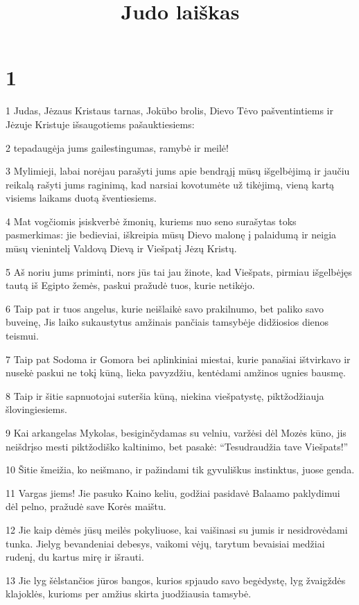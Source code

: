 

\title{Judo laiškas}

\chapter{1}


\par 1 Judas, Jėzaus Kristaus tarnas, Jokūbo brolis, Dievo Tėvo pašventintiems ir Jėzuje Kristuje išsaugotiems pašauktiesiems: 
\par 2 tepadaugėja jums gailestingumas, ramybė ir meilė! 
\par 3 Mylimieji, labai norėjau parašyti jums apie bendrąjį mūsų išgelbėjimą ir jaučiu reikalą rašyti jums raginimą, kad narsiai kovotumėte už tikėjimą, vieną kartą visiems laikams duotą šventiesiems. 
\par 4 Mat vogčiomis įsiskverbė žmonių, kuriems nuo seno surašytas toks pasmerkimas: jie bedieviai, iškreipia mūsų Dievo malonę į palaidumą ir neigia mūsų vienintelį Valdovą Dievą ir Viešpatį Jėzų Kristų. 
\par 5 Aš noriu jums priminti, nors jūs tai jau žinote, kad Viešpats, pirmiau išgelbėjęs tautą iš Egipto žemės, paskui pražudė tuos, kurie netikėjo. 
\par 6 Taip pat ir tuos angelus, kurie neišlaikė savo prakilnumo, bet paliko savo buveinę, Jis laiko sukaustytus amžinais pančiais tamsybėje didžiosios dienos teismui. 
\par 7 Taip pat Sodoma ir Gomora bei aplinkiniai miestai, kurie panašiai ištvirkavo ir nusekė paskui ne tokį kūną, lieka pavyzdžiu, kentėdami amžinos ugnies bausmę. 
\par 8 Taip ir šitie sapnuotojai suteršia kūną, niekina viešpatystę, piktžodžiauja šlovingiesiems. 
\par 9 Kai arkangelas Mykolas, besiginčydamas su velniu, varžėsi dėl Mozės kūno, jis neišdrįso mesti piktžodiško kaltinimo, bet pasakė: “Tesudraudžia tave Viešpats!” 
\par 10 Šitie šmeižia, ko neišmano, ir pažindami tik gyvuliškus instinktus, juose genda. 
\par 11 Vargas jiems! Jie pasuko Kaino keliu, godžiai pasidavė Balaamo paklydimui dėl pelno, pražudė save Korės maištu. 
\par 12 Jie kaip dėmės jūsų meilės pokyliuose, kai vaišinasi su jumis ir nesidrovėdami tunka. Jie­lyg bevandeniai debesys, vaikomi vėjų, tarytum bevaisiai medžiai rudenį, du kartus mirę ir išrauti. 
\par 13 Jie lyg šėlstančios jūros bangos, kurios spjaudo savo begėdystę, lyg žvaigždės klajoklės, kurioms per amžius skirta juodžiausia tamsybė. 
